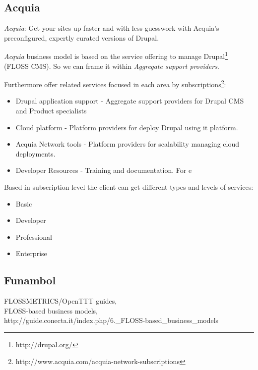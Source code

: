 \documentclass[11pt]{scrartcl}
\begin{document}
\subsection{Acquia}

\par \emph{Acquia}: Get your sites up faster and with less guesswork with Acquia’s preconfigured, expertly curated versions of Drupal.

\par \emph{Acquia} business model is based on the service offering to manage Drupal\footnote{http://drupal.org/} (FLOSS CMS). So we can frame it within \emph{Aggregate support providers}. 

Furthermore offer related services focused in each area by subscriptions\footnote{http://www.acquia.com/acquia-network-subscriptions}:

\begin{itemize}
	\item Drupal application support - Aggregate support providers for Drupal CMS and Product specialists
	\item Cloud platform - Platform providers for deploy Drupal using it platform.
	\item Acquia Network tools - Platform providers for scalability managing cloud deployments.
	\item Developer Resources - Training and documentation. For e
\end{itemize}

\par Based in subscription level the client can get different types and levels of services:

\begin{itemize}
	\item Basic
	\item Developer
	\item Professional
	\item Enterprise
\end{itemize}

\subsection{Funambol}



\begin{thebibliography}{9}

    FLOSSMETRICS/OpenTTT guides,\\
    FLOSS-based business models,\\
    http://guide.conecta.it/index.php/6.\_FLOSS-based\_business\_models
    
\end{thebibliography}
\end{document}

